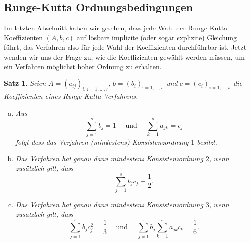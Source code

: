 \documentclass[
]{mycourse}
\theoremstyle{mythm}
\newtheorem{theorem}{Satz}[chapter]
\theoremstyle{break}
\begin{document}
\subsection{Runge-Kutta Ordnungsbedingungen}

Im letzten Abschnitt haben wir gesehen, dass jede Wahl der Runge-Kutta Koeffizienten $(A,b,c)$ auf 
lösbare implizite (oder sogar explizite) Gleichung führt, das Verfahren also für jede Wahl der Koeffizienten durchführbar ist.
Jetzt wenden wir uns der Frage zu, wie die Koeffizienten gewählt werden müssen, um ein Verfahren möglichst hoher Ordnung zu erhalten.


\begin{theorem}\label{thm:RungeKuttaOrderCond}
Seien $A=(a_{ij})_{i,j=1,\ldots,s}$, $b=(b_i)_{i=1,\ldots,s}$ und $c=(c_i)_{i=1,\ldots,s}$ die Koeffizienten eines Runge-Kutta-Verfahrens.
%
\begin{enumerate}[(a)]
\item Aus
\[
\sum_{j=1}^s b_j=1 \quad \mbox{ und } \quad \sum_{k=1}^s a_{jk}=c_j  
\]
folgt dass das Verfahren (mindestens) Konsistenzordnung $1$ besitzt.
\item Das Verfahren hat genau dann mindestens Konsistenzordnung $2$, wenn
zusätzlich gilt, dass
\[
\sum_{j=1}^s b_jc_j=\frac{1}{2}.
\]
\item Das Verfahren hat genau dann mindestens Konsistenzordnung $3$, wenn
zusätzlich gilt, dass
\[
\sum_{j=1}^s b_j c_j^2 = \frac{1}{3}  \quad \mbox{ und } \quad  
\sum_{j=1}^s b_j \sum_{k=1}^s a_{jk} c_k = \frac{1}{6}.
\]
\end{enumerate}
\end{theorem}
\end{document}
